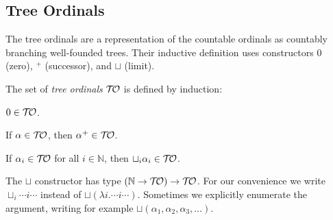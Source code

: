 \subsection{Tree Ordinals}\label{sub:tree}



%

%

The tree ordinals \citep{dennis-jones-wainer-84} are a representation
of the countable ordinals as countably branching well-founded
trees. Their inductive definition uses constructors $0$ (zero), $^+$
(successor), and $\sqcup$ (limit).

\begin{definition}\label{def:ordinals}%
The set of \emph{tree ordinals} $\mathcal{T\!O}$ is defined by induction:
\pagebreak[3]
\begin{compactenum}
  \item
    $0 \in \mathcal{T\!O}$.
  \item
    If $\alpha \in \mathcal{T\!O}$, then $\alpha^+ \in \mathcal{T\!O}$.
  \item
    If $\alpha_i \in \mathcal{T\!O}$ for all $i \in \mathbb{N}$, then $\sqcup_i
    \alpha_i \in \mathcal{T\!O}$.
\end{compactenum}
\end{definition}
The $\sqcup$ constructor has type $(\mathbb{N} \rightarrow \mathcal{T\!O}) \rightarrow
\mathcal{T\!O}$. For our convenience we write $\sqcup_i \cdots i \cdots$ instead
of $\sqcup (\lambda i . \cdots i \cdots)$. Sometimes we explicitly enumerate
the argument, writing for example $\sqcup ( \alpha_1, \alpha_2,
\alpha_3, \ldots )$.

